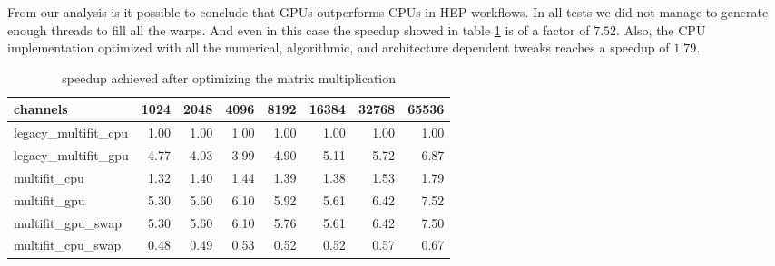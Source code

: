From our analysis is it possible to conclude that GPUs outperforms CPUs in HEP workflows. In all tests we did not manage to generate enough threads to fill all the warps. And even in this case the speedup showed in table \ref{tab:speedup} is of a factor of $7.52$. Also, the CPU implementation optimized with all the numerical, algorithmic, and architecture dependent tweaks reaches a speedup of $1.79$.  
\begin{table}[h]
  \caption{speedup achieved after optimizing the matrix multiplication}
  \label{tab:speedup}
  \begin{tabular}{lrrrrrrr}
    \toprule
    channels &  1024  &  2048  &  4096  &  8192  &  16384 &  32768 &  65536 \\
    \midrule
    legacy\_multifit\_cpu &   1.00 &   1.00 &   1.00 &   1.00 &   1.00 &   1.00 &   1.00 \\
    legacy\_multifit\_gpu &   4.77 &   4.03 &   3.99 &   4.90 &   5.11 &   5.72 &   6.87 \\
    multifit\_cpu        &   1.32 &   1.40 &   1.44 &   1.39 &   1.38 &   1.53 &   1.79 \\
    multifit\_gpu        &   5.30 &   5.60 &   6.10 &   5.92 &   5.61 &   6.42 &   7.52 \\
    multifit\_gpu\_swap   &   5.30 &   5.60 &   6.10 &   5.76 &   5.61 &   6.42 &   7.50 \\
    multifit\_cpu\_swap   &   0.48 &   0.49 &   0.53 &   0.52 &   0.52 &   0.57 &   0.67 \\
    \bottomrule
    \end{tabular}
\end{table}
